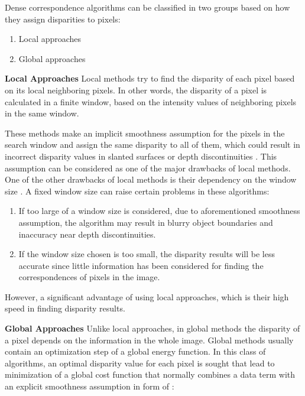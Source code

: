 \documentclass[dvips,letterpaper,12pt]{report}
\begin{document}
Dense correspondence algorithms can be classified in two groups based on how they assign
disparities to pixels:
\begin{enumerate}
\item Local approaches
\item Global approaches
\end{enumerate}

\textbf{Local Approaches}
\newline
Local methods try to find the disparity of each pixel based on its local neighboring pixels. In
other words, the disparity of a pixel is calculated in a finite window, based on the intensity values
of neighboring pixels in the same window. \cite{sch02}

These methods make an implicit smoothness assumption for the pixels in the search
window and assign the same disparity to all of them, which could result in incorrect disparity values in slanted surfaces or
depth discontinuities \cite{hirsch02}. This assumption can be considered as one of the major drawbacks of local methods. One
of the other drawbacks of local methods is their dependency on the window size \cite{sch02}. A fixed window size can raise certain problems in these algorithms:
\begin{enumerate}
\item If too large of a window size is considered, due to aforementioned smoothness assumption, the algorithm may result in blurry object boundaries and inaccuracy near depth discontinuities.
\item If the window size chosen is too small, the disparity results will be less accurate since little information has been considered for 
finding the correspondences of pixels in the image.
\end{enumerate}

However, a significant advantage of using local approaches, which is their high speed in finding disparity results.\newline

\textbf {Global Approaches}
\newline
Unlike local approaches, in global methods the disparity of a pixel depends on the information in
the whole image. Global methods usually contain an optimization step of a global energy
function. In this class of algorithms, an optimal disparity value for each pixel is sought that lead to minimization of a global cost
function that normally combines a data term with an explicit smoothness assumption in form of \cite{roy98,bobi99,boyk01}:
\end{document}
